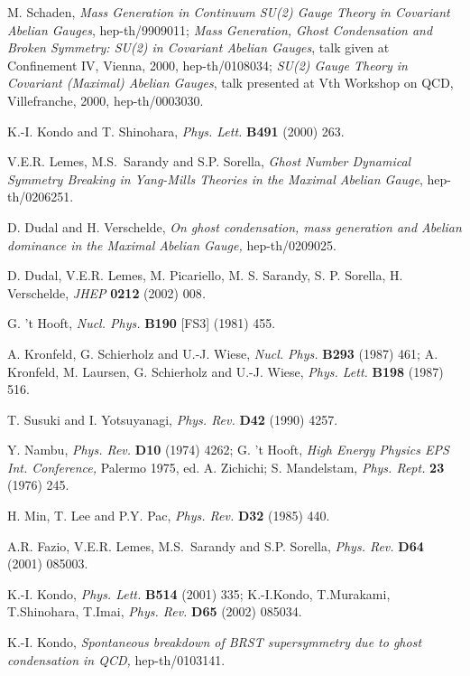 \documentclass[a4paper,12pt]{article}
\begin{document}
\begin{thebibliography}{99}
  M. Schaden, \emph{Mass Generation in Continuum SU(2) Gauge
Theory in Covariant Abelian Gauges}, hep-th/9909011; \emph{Mass Generation,
Ghost Condensation and Broken Symmetry: SU(2) in Covariant Abelian Gauges},
talk given at Confinement IV, Vienna, 2000, hep-th/0108034; \emph{SU(2)
Gauge Theory in Covariant (Maximal) Abelian Gauges}, talk presented at Vth
Workshop on QCD, Villefranche, 2000, hep-th/0003030.

  K.-I. Kondo and T. Shinohara, \emph{Phys. Lett. }\textbf{B491}
(2000) 263.

  V.E.R. Lemes, M.S.\ Sarandy and S.P. Sorella, \emph{Ghost
Number Dynamical Symmetry Breaking in Yang-Mills Theories in the Maximal
Abelian Gauge}, hep-th/0206251.

  D. Dudal and H. Verschelde, \emph{On ghost condensation, mass
generation and Abelian dominance in the Maximal Abelian Gauge, }%
hep-th/0209025.

  D. Dudal, V.E.R. Lemes, M. Picariello, M. S. Sarandy, S. P.
Sorella, H. Verschelde, \emph{JHEP} \textbf{0212} (2002) 008\emph{.}

  G. 't Hooft, \emph{Nucl. Phys. }\textbf{B190} [FS3] (1981) 455.

  A. Kronfeld, G. Schierholz and U.-J. Wiese, \emph{Nucl. Phys. }%
\textbf{B293} (1987) 461;\newline
A. Kronfeld, M. Laursen, G. Schierholz and U.-J. Wiese, \emph{Phys. Lett. }%
\textbf{B198} (1987) 516.

  T. Susuki and I. Yotsuyanagi, \emph{Phys. Rev. }\textbf{D42 }
(1990) 4257.

  Y. Nambu, \emph{Phys. Rev. }\textbf{D10} (1974) 4262;\newline
G. 't Hooft, \emph{High Energy Physics EPS Int. Conference, }Palermo 1975,
ed. A. Zichichi;\newline
S. Mandelstam, \emph{Phys. Rept. }\textbf{23} (1976) 245.

  H. Min, T. Lee and P.Y. Pac, \emph{Phys. Rev. }\textbf{D32}
(1985) 440.

  A.R. Fazio, V.E.R. Lemes, M.S.\ Sarandy and S.P. Sorella, 
\emph{Phys. Rev. }\textbf{D64} (2001) 085003.

  K.-I. Kondo, \emph{Phys. Lett.} \textbf{B514} (2001) 335;
K.-I.Kondo, T.Murakami, T.Shinohara, T.Imai, \emph{Phys. Rev.} \textbf{D65}
(2002) 085034.

  K.-I. Kondo, \emph{Spontaneous breakdown of BRST supersymmetry
due to ghost condensation in QCD}\textit{, }hep-th/0103141.


\end{thebibliography}
\end{document}
